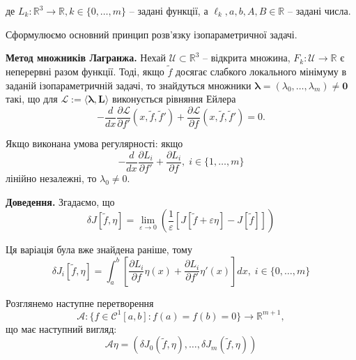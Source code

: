 \documentclass[14pt]{extarticle}
\newcommand{\<}{\langle}
\renewcommand{\>}{\rangle}
\theoremstyle{mystyle}{\newtheorem{definition}{Definition}[section]}
\theoremstyle{mystyle}{\newtheorem{proposition}[definition]{Proposition}}
\theoremstyle{mystyle}{\newtheorem{theorem}[definition]{Theorem}}
\theoremstyle{mystyle}{\newtheorem{lemma}[definition]{Lemma}}
\theoremstyle{mystyle}{\newtheorem{corollary}[definition]{Corollary}}
\theoremstyle{mystyle}{\newtheorem*{remark}{Remark}}
\theoremstyle{mystyle}{\newtheorem*{remarks}{Remarks}}
\theoremstyle{mystyle}{\newtheorem*{example}{Example}}
\theoremstyle{mystyle}{\newtheorem*{examples}{Examples}}
\theoremstyle{definition}{\newtheorem*{exercise}{Exercise}}
\theoremstyle{cstyle}{\newtheorem*{cthm}{}}
\theoremstyle{warn}
\begin{document}
де $L_k: \mathbb{R}^3 \to \mathbb{R}, k \in \{0,\dots,m\}$ -- задані функції, а $\ell_k,a,b,A,B \in \mathbb{R}$ -- задані числа. 

Сформулюємо основний принцип розв'язку ізопараметричної задачі.

\begin{theorem}
\textbf{Метод множників Лагранжа.} Нехай $\mathcal{U} \subset \mathbb{R}^3$ -- відкрита множина, $F_k: \mathcal{U} \to \mathbb{R}$ є неперервні разом функції. Тоді, якщо $\widetilde{f}$ досягає слабкого локального мінімуму в заданій ізопараметричній задачі, то знайдуться множники $\boldsymbol{\lambda} = (\lambda_0,\dots,\lambda_m) \neq \mathbf{0}$ такі, що для $\mathcal{L} := \langle \boldsymbol{\lambda}, \boldsymbol{L}\rangle$ виконується рівняння Ейлера
\begin{equation}
    -\frac{d}{dx} \frac{\partial \mathcal{L}}{\partial f'}(x,\widetilde{f},\widetilde{f}') + \frac{\partial \mathcal{L}}{\partial f}(x,\widetilde{f},\widetilde{f}') = 0.
\end{equation}

Якщо виконана умова регулярності: якщо
\begin{equation}
    -\frac{d}{dx}\frac{\partial L_i}{\partial f'} + \frac{\partial L_i}{\partial f}, \; i \in \{1,\dots,m\}
\end{equation}
лінійно незалежні, то $\lambda_0 \neq 0$.
\end{theorem}

\textbf{Доведення.} Згадаємо, що
\begin{equation}
    \delta J[\widetilde{f},\eta] = \lim_{\varepsilon \to 0}\left(\frac{1}{\varepsilon}\left[J[\widetilde{f}+\varepsilon\eta] - J[\widetilde{f}]\right]\right)
\end{equation}

Ця варіація була вже знайдена раніше, тому
\begin{equation}
    \delta J_i[\widetilde{f},\eta] = \int_a^b \left[\frac{\partial L_i}{\partial f}\eta(x) + \frac{\partial L_i}{\partial f'}\eta'(x)\right]dx, \; i \in \{0,\dots,m\}
\end{equation}

Розглянемо наступне перетворення
\begin{equation}
    \mathcal{A}: \{f \in \mathcal{C}^1[a,b]: f(a)=f(b)=0\} \to \mathbb{R}^{m+1},
\end{equation}
що має наступний вигляд:
\begin{equation}
    \mathcal{A}\eta = (\delta J_0(\widetilde{f},\eta),\dots,\delta J_m(\widetilde{f},\eta))
\end{equation}
\end{document}
